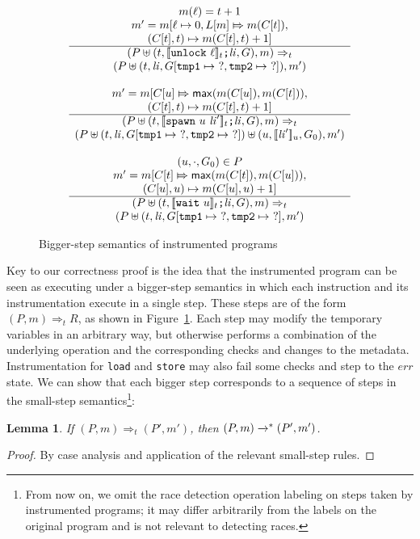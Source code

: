 \documentclass[preprint, 10pt]{sigplanconf}
\newcommand{\meanl}{\ensuremath{[ \! [}}
\newcommand{\meanr}{\ensuremath{] \! ]}}
\newcommand{\means}[1]{\ensuremath{\meanl #1 \meanr}}
\newcommand{\unlock}[1]{\texttt{unlock}\ #1}
\newcommand{\spawn}[2]{\texttt{spawn}\ #1\ #2}
\newcommand{\wait}[1]{\texttt{wait}\ #1}
\newcommand{\instr}[2]{\ensuremath{\means{#2}_{#1}}}
\newcommand{\cfg}[2]{\ensuremath{(#1, #2)}}
\newcommand{\execstar}[4]{\ensuremath{\cfg{#1}{#2} \tto{#3} #4}}
\newcommand{\iexec}[4]{\ensuremath{\cfg{#1}{#2} \Rightarrow_{#3} #4}}
\newcommand{\tto}[1]{\mathrel{
  \vphantom{\xrightarrow{#1}}
  \smash{\xrightarrow{#1}}
  \vphantom{\to}^{*}}
}
\newtheorem{lemma}{Lemma}
\begin{document}
\begin{figure}[htb]
\[\begin{array}{c}
\multicolumn{1}{c}{m(\ell) = t + 1}
\\
\multicolumn{1}{c}{m' = m[\ell \mapsto 0, L[m] \Mapsto m(C[t]),}
\\
\multicolumn{1}{c}{(C[t], t) \mapsto m(C[t], t) + 1]}
\\
\hline
\cfg{P \uplus (t, \instr{t}{\unlock{\ell}}\texttt{;} \mathit{li}, G)}{m}
\Rightarrow_{t} \\
\cfg{P \uplus (t, \mathit{li}, G[\texttt{tmp1} \mapsto\ ?, \texttt{tmp2} \mapsto\ ?])}{m'}
\\\\

\multicolumn{1}{c}{m' = m[C[u] \Mapsto \mathsf{max}(m(C[u]), m(C[t])),} 
\\
\multicolumn{1}{c}{ (C[t], t) \mapsto m(C[t], t) + 1]}
\\
\hline
\cfg{P \uplus (t, \instr{t}{\spawn{u}{\mathit{li}'}}\texttt{;} \mathit{li}, G)}{m}
\Rightarrow_{t} \\
\cfg{P \uplus (t, \mathit{li}, G[\texttt{tmp1} \mapsto\ ?, \texttt{tmp2} \mapsto\ ?]) \uplus (u, \instr{u}{\mathit{li}'}, G_0)}{m'}
\\\\

\multicolumn{1}{c}{(u, \cdot, G_0) \in P}
\\
\multicolumn{1}{c}{m' = m[C[t] \Mapsto \mathsf{max}(m(C[t]), m(C[u])),} 
\\
\multicolumn{1}{c}{(C[u], u) \mapsto m(C[u], u) + 1]}\\
\hline
\cfg{P \uplus (t, \instr{t}{\wait{u}}\texttt{;} \mathit{li}, G)}{m}
\Rightarrow_{t} \\
\cfg{P \uplus (t, \mathit{li}, G[\texttt{tmp1} \mapsto\ ?, \texttt{tmp2} \mapsto\ ?]}{m'}

\end{array}
\]
\caption{Bigger-step semantics of instrumented programs}
\label{iexec}
\end{figure}
Key to our correctness proof is the idea that the instrumented program can be seen as executing under a bigger-step semantics in which each instruction and its instrumentation execute in a single step. These steps are of the form $\iexec{P}{m}{t}{R}$, as shown in Figure~\ref{iexec}. Each step may modify the temporary variables in an arbitrary way, but otherwise performs a combination of the underlying operation and the corresponding checks and changes to the metadata. Instrumentation for \texttt{load} and \texttt{store} may also fail some checks and step to the $\mathit{err}$ state. We can show that each bigger step corresponds to a sequence of steps in the small-step semantics\footnote{From now on, we omit the race detection operation labeling on steps taken by instrumented programs; it may differ arbitrarily from the labels on the original program and is not relevant to detecting races.}:
\begin{lemma}\label{iexec-exec}If $\iexec{P}{m}{t}{(P', m')}$, then $\execstar{P}{m}{}{(P', m')}$.\end{lemma}
\begin{proof}By case analysis and application of the relevant small-step rules.\end{proof}
\end{document}
